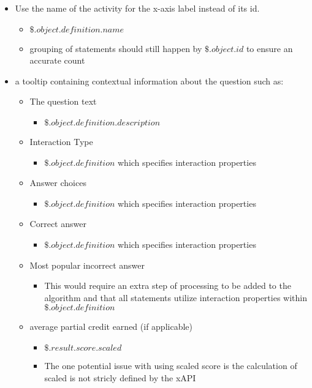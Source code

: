 \documentclass{article}
\begin{document}
\begin{itemize}
\item Use the name of the activity for the x-axis label instead of
  its id.
  \begin{itemize}
  \item $\$.object.definition.name$
  \item grouping of statements should still happen by
    $\$.object.id$ to ensure an accurate count
  \end{itemize}
\item a tooltip containing contextual information about the question
  such as:
  \begin{itemize}
  \item The question text
    \begin{itemize}
    \item $\$.object.definition.description$
    \end{itemize}
  \item Interaction Type
    \begin{itemize}
      \item $\$.object.definition$ which specifies interaction properties
    \end{itemize}
  \item Answer choices
    \begin{itemize}
      \item $\$.object.definition$ which specifies interaction properties
    \end{itemize}
  \item Correct answer
    \begin{itemize}
      \item $\$.object.definition$ which specifies interaction properties
    \end{itemize}
  \item Most popular incorrect answer
    \begin{itemize}
      \item This would require an extra step of processing to be added to
      the algorithm and that all statements utilize interaction
      properties within $\$.object.definition$
    \end{itemize}
  \item average partial credit earned (if applicable)
    \begin{itemize}
    \item $\$.result.score.scaled$
    \item The one potential issue with using scaled score is the
      calculation of scaled is not stricly defined by the xAPI

\end{itemize}
\end{itemize}
\end{itemize}
\end{document}
